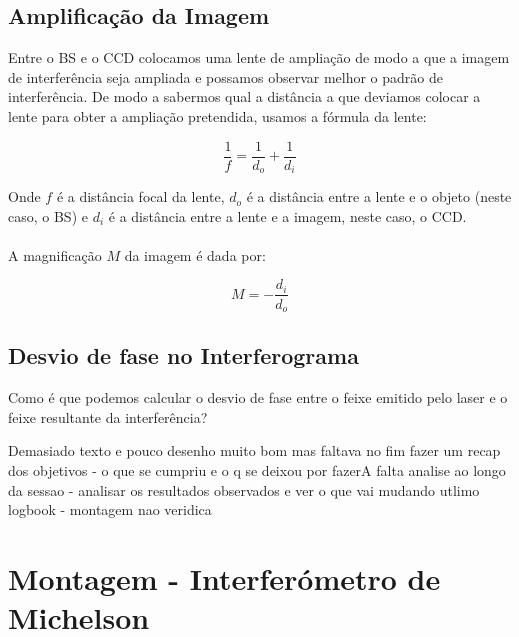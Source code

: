 \documentclass{article}
\begin{document}
\begin{multicols}{2}
\subsection{Amplificação da Imagem}

Entre o BS e o CCD colocamos uma lente de ampliação de modo a que a imagem de interferência seja ampliada e possamos observar melhor o padrão de interferência.
De modo a sabermos qual a distância a que deviamos colocar a lente para obter a ampliação pretendida, usamos a fórmula da lente:

\[ \frac{1}{f} = \frac{1}{d_o} + \frac{1}{d_i} \]

Onde $f$ é a distância focal da lente, $d_o$ é a distância entre a lente e o objeto (neste caso, o BS) e $d_i$ é a distância entre a lente e a imagem, neste caso, o CCD.
\paragraph{}
A magnificação $M$ da imagem é dada por:

\[ M = - \frac{d_i}{d_o} \]

\subsection{Desvio de fase no Interferograma}

Como é que podemos calcular o desvio de fase entre o feixe emitido pelo laser e o feixe resultante da interferência?

Demasiado texto e pouco desenho
muito bom mas faltava no fim fazer um recap dos objetivos - o que se cumpriu e o q se deixou por fazerA
falta analise ao longo da sessao - analisar os resultados observados e ver o que vai mudando
utlimo logbook - montagem nao veridica

\end{multicols}



\newpage

\section{Montagem - Interferómetro de Michelson}

\vspace{3cm}
\end{document}

